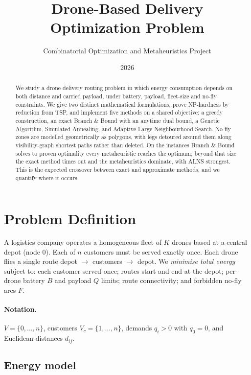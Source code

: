 \documentclass[11pt,a4paper]{article}
\title{Drone-Based Delivery Optimization Problem}
\author{Combinatorial Optimization and Metaheuristics Project}
\date{2026}
\begin{document}
\maketitle

\begin{abstract}
We study a drone delivery routing problem in which energy consumption depends on
both distance and carried payload, under battery, payload, fleet-size and no-fly
constraints. We give two distinct mathematical formulations, prove NP-hardness by
reduction from TSP, and implement five methods on a shared objective: a greedy
construction, an exact Branch \& Bound with an anytime dual bound, a Genetic
Algorithm, Simulated Annealing, and Adaptive Large Neighbourhood Search. No-fly
zones are modelled geometrically as polygons, with legs detoured around them
along visibility-graph shortest paths rather than deleted. On the instances
Branch \& Bound solves to proven optimality every metaheuristic reaches the
optimum; beyond that size the exact method times out and the metaheuristics
dominate, with ALNS strongest. This is the expected crossover between exact and
approximate methods, and we quantify where it occurs.
\end{abstract}

\tableofcontents

\section{Problem Definition}

A logistics company operates a homogeneous fleet of $K$ drones based at a central
depot (node $0$). Each of $n$ customers must be served exactly once. Each drone
flies a single route depot $\rightarrow$ customers $\rightarrow$ depot. We
\emph{minimise total energy} subject to: each customer served once; routes
start and end at the depot; per-drone battery $B$ and payload $Q$ limits; route
connectivity; and forbidden no-fly arcs $F$.

\paragraph{Notation.}
$V=\{0,\dots,n\}$, customers $V_c=\{1,\dots,n\}$, demands $q_i>0$ with $q_0=0$,
and Euclidean distances $d_{ij}$.

\subsection{Energy model}
\end{document}
